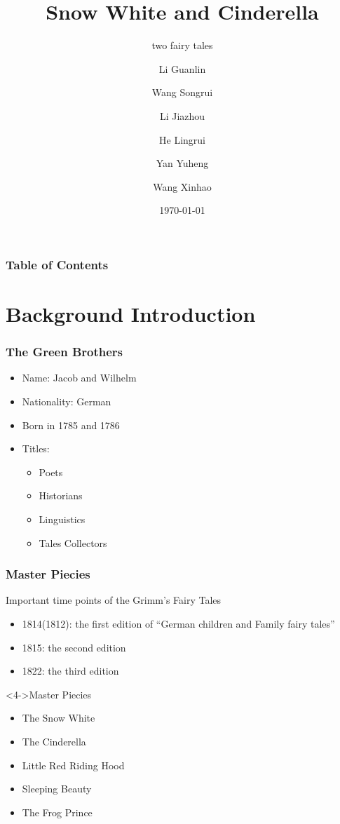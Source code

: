 \documentclass{beamer}
\title[Reflection on Snow White and Cinderella]
{Snow White and Cinderella}
\subtitle{two fairy tales}
\author[Eric, Richard] %
{Li Guanlin\inst{1} \and Wang Songrui\inst{1} \and Li Jiazhou\inst{1} \and He Lingrui\inst{1} \and Yan Yuheng\inst{1} \and Wang Xinhao\inst{1}}
\institute[NJU] %
{
\inst{1}%
Undeegraduate in ICS\\
Nanjing University
}
\date[NJU 2023] %
{\today}
\begin{document}
\frame{\titlepage}

\begin{frame}
    \frametitle{Table of Contents}
    \tableofcontents
\end{frame}

\section{Background Introduction}
\begin{frame}
    \frametitle{The Green Brothers}
    \begin{itemize}
        \item<1-> Name: Jacob and Wilhelm
        \item<2-> Nationality: German
        \item<3-> Born in 1785 and 1786
        \item<4-> Titles:
            \begin{itemize}
                \item Poets
                \item Historians
                \item Linguistics
                \item \alert{Tales Collectors}
            \end{itemize}
    \end{itemize}
\end{frame}

\begin{frame}
    \frametitle{Master Piecies}
    \begin{block}{Important time points of the Grimm's Fairy Tales}
        \begin{itemize}
            \item<1-> 1814(1812): the first edition of ``German children and Family fairy tales''
            \item<2-> 1815: the second edition
            \item<3-> 1822: the third edition %
        \end{itemize}
    \end{block}
    \begin{block}<4->{Master Piecies}
        \begin{itemize}
            \item<5-> \alert{The Snow White}
            \item<5-> \alert{The Cinderella}
            \item<4-> Little Red Riding Hood
            \item<4-> Sleeping Beauty
            \item<4-> The Frog Prince
        \end{itemize}
    \end{block}
\end{frame}
\end{document}

